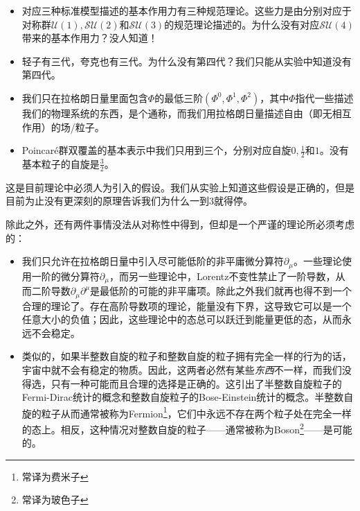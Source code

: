 \begin{itemize}
\item 对应三种标准模型描述的基本作用力有三种规范理论。这些力是由分别对应于对称群$\mathcal{U}(1), \mathcal{SU}(2)$和$\mathcal{SU}(3)$的规范理论描述的。为什么没有对应$\mathcal{SU}(4)$带来的基本作用力？没人知道！
\item 轻子有三代，夸克也有三代。为什么没有第四代？我们只能从实验中知道没有第四代。
\item 我们只在拉格朗日量里面包含$\Phi$的最低三阶$(\Phi^0, \Phi^1, \Phi^2)$，其中$\Phi$指代一些描述我们的物理系统的东西，是个通称，而我们用拉格朗日量描述自由（即无相互作用）的场/粒子。
\item Poincaré群双覆盖的基本表示中我们只用到三个，分别对应自旋$0, \tfrac{1}{2}$和$1$。没有基本粒子的自旋是$\tfrac{3}{2}$。
\end{itemize}

这是目前理论中必须人为引入的假设。我们从实验上知道这些假设是正确的，但是目前为止没有更深刻的原理告诉我们为什么一到$3$就得停。

除此之外，还有两件事情没法从对称性中得到，但却是一个严谨的理论所必须考虑的：

\begin{itemize}
\item 我们只允许在拉格朗日量中引入尽可能低阶的非平庸微分算符$\partial_\mu$。一些理论使用一阶的微分算符$\partial_\mu$，而另一些理论中，Lorentz不变性禁止了一阶导数，从而二阶导数$\partial_\mu\partial^\mu$是最低阶的可能的非平庸项。除此之外我们就再也得不到一个合理的理论了。存在高阶导数项的理论，能量没有下界，这导致它可以是一个任意大小的负值；因此，这些理论中的态总可以跃迁到能量更低的态，从而永远不会稳定。
\item 类似的，如果半整数自旋的粒子和整数自旋的粒子拥有完全一样的行为的话，宇宙中就不会有稳定的物质。因此，这两者必然有某些{\itshape 东西}不一样，而我们没得选，只有一种可能而且合理的选择是正确的。这引出了半整数自旋粒子的Fermi-Dirac统计的概念和整数自旋粒子的Bose-Einstein统计的概念。半整数自旋的粒子从而通常被称为Fermion\footnote{常译为费米子}，它们中永远不存在两个粒子处在完全一样的态上。相反，这种情况对整数自旋的粒子——通常被称为Boson\footnote{常译为玻色子}——是可能的。
\end{itemize}

